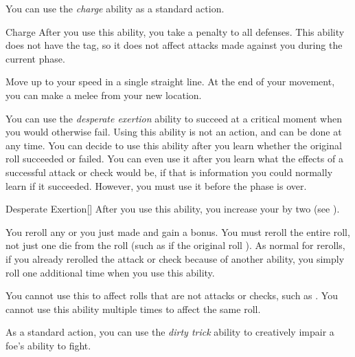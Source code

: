         \label{Charge} You can use the \textit{charge} ability as a standard action.

        \begin{activeability}{Charge}
            \rankline
            After you use this ability, you  take a  penalty to all defenses.
            This ability does not have the  tag, so it does not affect attacks made against you during the current phase.

            Move up to your speed in a single straight line.
            At the end of your movement, you can make a melee  from your new location.
        \end{activeability}

        \label{Desperate Exertion} You can use the \textit{desperate exertion} ability to succeed at a critical moment when you would otherwise fail.
        Using this ability is not an action, and can be done at any time.
        You can decide to use this ability after you learn whether the original roll succeeded or failed.
        You can even use it after you learn what the effects of a successful attack or check would be, if that is information you could normally learn if it succeeded.
        However, you must use it before the phase is over.

        \begin{activeability}{Desperate Exertion}[]
            \rankline
            After you use this ability, you increase your  by two (see ).

            You reroll any  or  you just made and gain a  bonus.
            You must reroll the entire roll, not just one die from the roll (such as if the original roll ).
            As normal for rerolls, if you already rerolled the attack or check because of another ability, you simply roll one additional time when you use this ability.

            You cannot use this to affect rolls that are not attacks or checks, such as .
            You cannot use this ability multiple times to affect the same roll.
        \end{activeability}

        \label{Dirty Trick} As a standard action, you can use the \textit{dirty trick} ability to creatively impair a foe's ability to fight.

